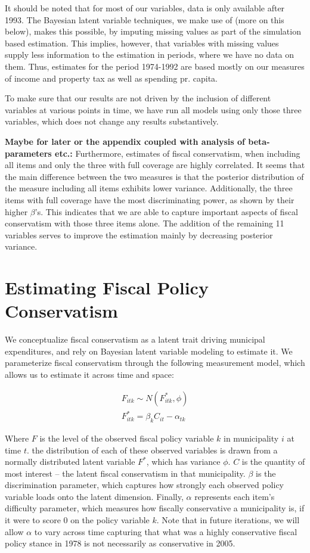 \documentclass[a4paper,11pt]{article}
\begin{document}
It should be noted that for most of our variables, data is only available after 1993. The Bayesian latent variable techniques, we make use of (more on this below), makes this possible, by imputing missing values as part of the simulation based estimation. This implies, however, that variables with missing values supply less information to the estimation in periods, where we have no data on them. Thus, estimates for the period 1974-1992 are based mostly on our measures of income and property tax as well as spending pr. capita. 

To make sure that our results are not driven by the inclusion of different variables at various points in time, we have run all models using only those three variables, which does not change any results substantively. 

\textbf{Maybe for later or the appendix coupled with analysis of beta-parameters etc.:} Furthermore, estimates of fiscal conservatism, when including all items and only the three with full coverage are highly correlated. It seems that the main difference between the two measures is that the posterior distribution of the measure including all items exhibits lower variance. Additionally, the three items with full coverage have the most discriminating power, as shown by their higher $\beta$'s. This indicates that we are able to capture important aspects of fiscal conservatism with those three items alone. The addition of the remaining 11 variables serves to improve the estimation mainly by decreasing posterior variance.

\section*{Estimating Fiscal Policy Conservatism}

We conceptualize fiscal conservatism as a latent trait driving municipal expenditures, and rely on Bayesian latent variable modeling to estimate it. We parameterize fiscal conservatism through the following measurement model, which allows us to estimate it across time and space:

\begin{gather*}
F_{itk} \sim N(F^*_{itk}, \phi)\\
F^*_{itk} = \beta_k C_{it} - \alpha_{tk}
\end{gather*}

\noindent Where $F$ is the level of the observed fiscal policy variable $k$ in municipality $i$ at time $t$. the distribution of each of these observed variables is drawn from a normally distributed latent variable $F^*$, which has variance $\phi$. $C$ is the quantity of most interest -- the latent fiscal conservatism in that municipality. $\beta$ is the discrimination parameter, which captures how strongly each observed policy variable loads onto the latent dimension. Finally, $\alpha$ represents each item's difficulty parameter, which measures how fiscally conservative a municipality is, if it were to score 0 on the policy variable $k$. Note that in future iterations, we will allow $\alpha$ to vary across time capturing that what was a highly conservative fiscal policy stance in 1978 is not necessarily as conservative in 2005.
\end{document}
